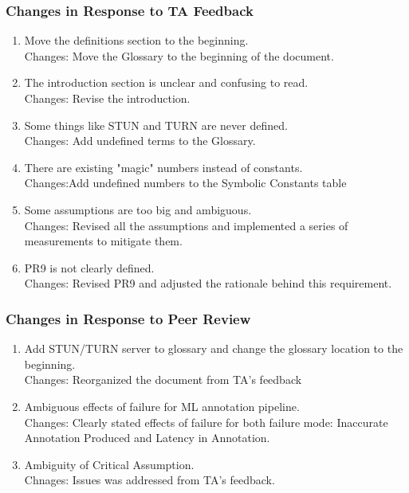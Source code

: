 \documentclass{article}
\begin{document}
\subsubsection{Changes in Response to TA Feedback}
\begin{enumerate}
        \item Move the definitions section to the beginning.\\
                Changes: Move the Glossary to the beginning of the document.
        \item The introduction section is unclear and confusing to read.\\
                Changes: Revise the introduction.
        \item Some things like STUN and TURN are never defined.\\
                Changes: Add undefined terms to the Glossary.
        \item There are existing "magic" numbers instead of constants.\\
                Changes:Add undefined numbers to the Symbolic Constants table
        \item Some assumptions are too big and ambiguous.\\
                Changes: Revised all the assumptions and implemented a series of measurements to mitigate them.
        \item PR9 is not clearly defined.\\
                Changes: Revised PR9 and adjusted the rationale behind this requirement.
\end{enumerate}
\subsubsection{Changes in Response to Peer Review}
\begin{enumerate}
        \item Add STUN/TURN server to glossary and change the glossary location to the beginning.\\
                Changes: Reorganized the document from TA's feedback
        \item Ambiguous effects of failure for ML annotation pipeline.\\
                Changes: Clearly stated effects of failure for both failure mode: Inaccurate Annotation Produced and Latency in
                Annotation.
        \item Ambiguity of Critical Assumption.\\
                Chnages: Issues was addressed from TA's feedback.        
\end{enumerate}
\end{document}
